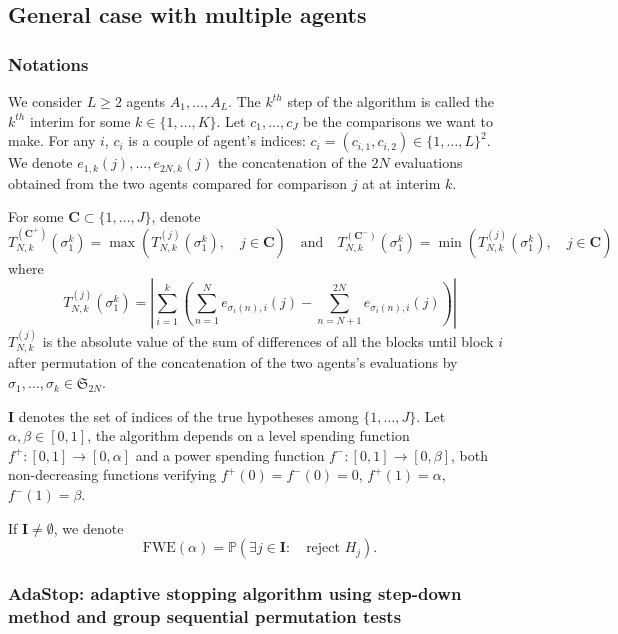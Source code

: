 \documentclass{article}
\theoremstyle{plain}
\theoremstyle{remark}
\renewcommand{\P}{\mathbb{P}}
\renewcommand{\S}{\mathfrak{S}}
\newcommand{\1}{\mathbbm{1}}
\numberwithin{equation}{section}
\begin{document}
\subsection{General case with multiple agents}\label{sec:multi}

\subsubsection{Notations}
 We consider $L\ge 2$ agents $A_1,\dots,A_L$. The $k^{th}$ step of the algorithm is called the $k^{th}$ interim for some $k \in \{1,\dots,K\}$. Let $c_1,\dots,c_J$ be the comparisons we want to make. For any $i$, $c_i$ is a couple of agent's indices: $c_i=(c_{i,1},c_{i,2}) \in \{1,\dots,L\}^2$. We denote $e_{1,k}(j), \dots, e_{2N, k}(j)$ the concatenation of the $2N$ evaluations obtained from the two agents compared for comparison $j$ at at interim $k$.

For some $\textbf{C} \subset \{1,\dots,J\}$, denote
$$T_{N,k}^{(\textbf{C}^+)}(\sigma_1^k)= \max\left(T_{N,k}^{(j)}(\sigma_1^k),\quad j \in \textbf{C}\right) \quad \text{and}\quad T_{N,k}^{(\textbf{C}^-)}(\sigma_1^k)= \min\left(T_{N,k}^{(j)}(\sigma_1^k),\quad j \in \textbf{C}\right)$$
where 
$$T_{N,k}^{(j)}(\sigma_1^k)= \left|\sum_{i=1}^k\left(\sum_{n=1}^{N} e_{\sigma_i(n),i}(j)-\sum_{n=N+1}^{2N} e_{\sigma_i(n),i}(j)\right)\right|$$ 
$T_{N,k}^{(j)}$ is the absolute value of the sum of differences of all the blocks until block $i$ after permutation of the concatenation of the two agents's evaluations by $\sigma_1,\dots,\sigma_k\in \S_{2N}$.
 
$\textbf{I}$ denotes the set of indices of the true hypotheses among $\{1,\dots,J\}$. Let $\alpha, \beta \in [0,1]$, the algorithm depends on a level spending function $f^+:[0,1]\to[0,\alpha]$ and a power spending function $f^-:[0,1]\to [0,\beta]$, both non-decreasing functions verifying $f^+(0)=f^-(0)=0$, $f^+(1)=\alpha$, $f^-(1)=\beta$. 

If $\textbf{I} \neq \emptyset$, we denote 
$$\mathrm{FWE}(\alpha) = \P\left(\exists j \in \textbf{I}:\quad  \text{reject }H_j \right).$$
\subsubsection{AdaStop: adaptive stopping algorithm using step-down method and group sequential permutation tests}\label{sec:main_algo}
\end{document}
